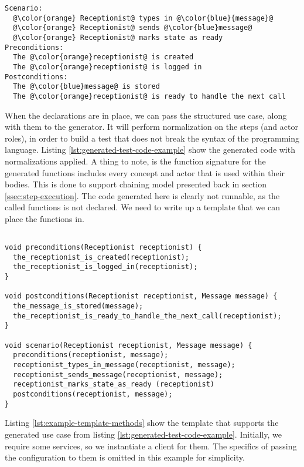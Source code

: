 \begin{lstlisting}[frame=single,style=usecase, caption=Use case example with its different parts highlighted, label=lst:uc-simple-example-highlighted-revisited]
Scenario:
  @\color{orange} Receptionist@ types in @\color{blue}{message}@
  @\color{orange} Receptionist@ sends @\color{blue}message@
  @\color{orange} Receptionist@ marks state as ready
Preconditions:
  The @\color{orange}receptionist@ is created
  The @\color{orange}receptionist@ is logged in
Postconditions:
  The @\color{blue}message@ is stored
  The @\color{orange}receptionist@ is ready to handle the next call
\end{lstlisting} 
When the declarations are in place, we can pass the structured use case, along with them to the generator. It will perform normalization on the steps (and actor roles), in order to build a test that does not break the syntax of the programming language. Listing \ref{lst:generated-test-code-example} show the generated code with normalizations applied. A thing to note, is the function signature for the generated functions includes every concept and actor that is used within their bodies. This is done to support chaining model presented back in section \ref{ssec:step-execution}. The code generated here is clearly not runnable, as the called functions is not declared. We need to write up a template that we can place the functions in.
\begin{lstlisting}[style=Dart, caption=Example of generated code without a template applied concept,label={lst:generated-test-code-example}]

void preconditions(Receptionist receptionist) {
  the_receptionist_is_created(receptionist);
  the_receptionist_is_logged_in(receptionist);
}

void postconditions(Receptionist receptionist, Message message) {
  the_message_is_stored(message);
  the_receptionist_is_ready_to_handle_the_next_call(receptionist);
}

void scenario(Receptionist receptionist, Message message) {
  preconditions(receptionist, message);
  receptionist_types_in_message(receptionist, message);
  receptionist_sends_message(receptionist, message);
  receptionist_marks_state_as_ready (receptionist)  
  postconditions(receptionist, message);
}

\end{lstlisting}

\noindent Listing \ref{lst:example-template-methods} show the template that supports the generated use case from listing \ref{lst:generated-test-code-example}. Initially, we require some services, so we instantiate a client for them. The specifics of passing the configuration to them is omitted in this example for simplicity.\medskip

